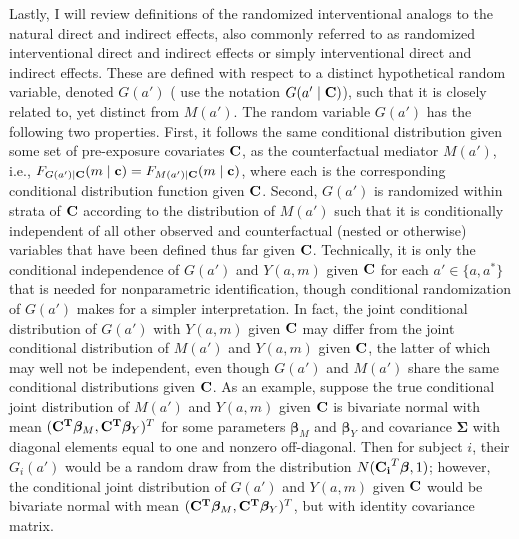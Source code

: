 \documentclass[12pt]{article}
\begin{document}
Lastly, I will review definitions of the randomized interventional analogs to the natural direct and indirect effects, also commonly referred to as randomized interventional direct and indirect effects or simply interventional direct and indirect effects. These are defined with respect to a distinct hypothetical random variable, denoted $G(a')$ (\cite{vanderweele2014effect} use the notation $G(a'\mid {\bf C})$), such that it is closely related to, yet distinct from $M(a')$. %
The random variable $G(a')$ has the following two properties. First, it follows the same conditional distribution given some set of pre-exposure covariates ${\bf C}$, as the counterfactual mediator $M(a')$, i.e., $F_{G(a')\mid {\bf C}}(m\mid {\bf c}) = F_{M(a')\mid {\bf C}}(m\mid {\bf c})$, where each is the corresponding conditional distribution function given ${\bf C}$. Second, $G(a')$ is randomized within strata of ${\bf C}$ according to the distribution of $M(a')$ such that it is conditionally independent of all other observed and counterfactual (nested or otherwise) variables that have been defined thus far given ${\bf C}$. Technically, it is only the conditional independence of $G(a')$ and $Y(a,m)$ given ${\bf C}$ for each $a'\in\{a,a^*\}$ that is needed for nonparametric identification, though conditional randomization of $G(a')$ makes for a simpler interpretation. In fact, the joint conditional distribution of $G(a')$ with $Y(a,m)$ given $\bf C$ may differ from the joint conditional distribution of $M(a')$ and $Y(a,m)$ given $\bf C$, the latter of which may well not be independent, even though $G(a')$ and $M(a')$ share the same conditional distributions given $\bf C$. As an example, suppose the true conditional joint distribution of $M(a')$ and $Y(a,m)$ given $\bf C$ is bivariate normal with mean $({\bf C^T}\boldsymbol{\beta}_M, {\bf C^T}\boldsymbol{\beta}_Y)^T$ for some parameters $\boldsymbol{\beta}_M$ and $\boldsymbol{\beta}_Y$ and covariance $\boldsymbol\Sigma$ with diagonal elements equal to one and nonzero off-diagonal. Then for subject $i$, their $G_i(a')$ would be a random draw from the distribution $N({\bf C_i}^T\boldsymbol{\beta},1)$; however, the conditional joint distribution of $G(a')$ and $Y(a,m)$ given $\bf C$ would be bivariate normal with mean $({\bf C^T}\boldsymbol{\beta}_M, {\bf C^T}\boldsymbol{\beta}_Y)^T$, but with identity covariance matrix.
\end{document}
